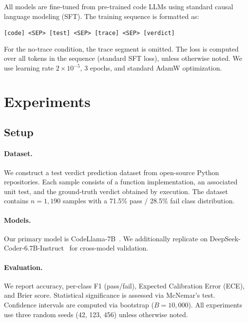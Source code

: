 \documentclass[11pt,a4paper]{article}
\begin{document}
All models are fine-tuned from pre-trained code LLMs using standard causal language modeling (SFT). The training sequence is formatted as:

\vspace{0.3em}
\noindent\texttt{[code] <SEP> [test] <SEP> [trace] <SEP> [verdict]}
\vspace{0.3em}

\noindent For the no-trace condition, the trace segment is omitted. The loss is computed over all tokens in the sequence (standard SFT loss), unless otherwise noted. We use learning rate $2 \times 10^{-5}$, 3 epochs, and standard AdamW optimization.

\section{Experiments}

\subsection{Setup}

\paragraph{Dataset.} We construct a test verdict prediction dataset from open-source Python repositories. Each sample consists of a function implementation, an associated unit test, and the ground-truth verdict obtained by execution. The dataset contains $n = 1{,}190$ samples with a 71.5\% pass / 28.5\% fail class distribution.

\paragraph{Models.} Our primary model is CodeLlama-7B~\cite{codellama}. We additionally replicate on DeepSeek-Coder-6.7B-Instruct~\cite{deepseek-coder} for cross-model validation.

\paragraph{Evaluation.} We report accuracy, per-class F1 (pass/fail), Expected Calibration Error (ECE), and Brier score. Statistical significance is assessed via McNemar's test. Confidence intervals are computed via bootstrap ($B=10{,}000$). All experiments use three random seeds (42, 123, 456) unless otherwise noted.
\end{document}
